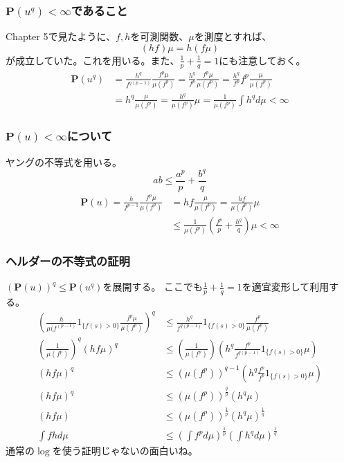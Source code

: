 \documentclass[11pt, a4paper]{jsarticle}
\theoremstyle{definition}
\begin{document}
      \subsubsection{$\mathbf{P}(u^q) < \infty$であること}
        Chapter 5で見たように、$f,h$を可測関数、$\mu$を測度とすれば、
        \[
          (hf)\mu = h(f\mu)
        \]
        が成立していた。これを用いる。また、$\frac{1}{p} + \frac{1}{q} = 1$にも注意しておく。
        \begin{align*}
          \mathbf{P}(u^q) &= \frac{h^q}{f^{q(p-1)}}\frac{f^p\mu}{\mu(f^p)}
          = \frac{h^q}{f^p}\frac{f^p\mu}{\mu(f^p)}
          = \frac{h^q}{f^p}f^p \frac{\mu}{\mu(f^p)} \\
          &= h^q \frac{\mu}{\mu(f^p)} = \frac{h^q}{\mu(f^p)}\mu
          =\frac{1}{\mu(f^p)}\int h^q d\mu < \infty
        \end{align*}

      \subsubsection{$\mathbf{P}(u) < \infty$について}
        ヤングの不等式を用いる。
        \[
          ab \leq \frac{a^p}{p} + \frac{b^q}{q}
        \]
        \begin{align*}
          \mathbf{P}(u)
          = \frac{h}{f^{p-1}}\frac{f^p\mu}{\mu(f^p)}
          &= hf\frac{\mu}{\mu(f^p)}
          = \frac{hf}{\mu(f^p)}\mu \\
          &\leq \frac{1}{\mu(f^p)} \left( \frac{f^p}{p} + \frac{h^q}{q} \right) \mu
          < \infty
        \end{align*}

      \subsubsection{ヘルダーの不等式の証明}
        $(\mathbf{P}(u))^q \leq \mathbf{P}(u^q)$を展開する。
        ここでも$\frac{1}{p} + \frac{1}{q} = 1$を適宜変形して利用する。
        \begin{align*}
          \left( \frac{h}{\mu(f^{(p-1)}} 1_{\{f(s) > 0\}} \frac{f^p \mu}{\mu(f^p)} \right)^q
          &\leq
          \frac{h^q}{f^{q(p-1)}}1_{\{f(s) > 0\}}\frac{f^p}{\mu(f^p)} \\
          \left(\frac{1}{\mu(f^p)}\right)^q (hf\mu)^q
          &\leq
          \left(\frac{1}{\mu(f^p)}\right) \left(h^q\frac{f^p}{f^{q(p-1)}}1_{\{f(s) > 0\}}\mu \right)\\
          (hf\mu)^q
          &\leq
          (\mu(f^p))^{q-1} \left(h^q \frac{f^p}{f^p}1_{\{f(s) > 0\}} \mu\right)\\
          (hf\mu)^q
          &\leq
          (\mu(f^p))^{\frac{q}{p}}(h^q \mu) \\
          (hf\mu)
          &\leq
          (\mu(f^p))^{\frac{1}{p}}(h^q\mu)^{\frac{1}{q}} \\
          \int fh d\mu
          &\leq
          \left(\int f^p d\mu \right)^{\frac{1}{p}} \left(\int h^q d\mu \right)^{\frac{1}{q}}
        \end{align*}
        通常の$\log$を使う証明じゃないの面白いね。
\end{document}
